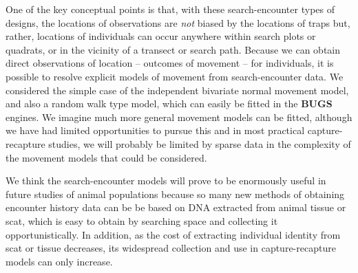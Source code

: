 One of the key conceptual points is that, with these search-encounter
types of designs, the locations of observations are {\it not} biased
by the locations of traps but, rather, locations of individuals can
occur anywhere within search plots or quadrats, or in the vicinity of
a transect or search path.  Because we can obtain direct observations
of location -- outcomes of movement -- for individuals, it is possible
to resolve explicit models of movement from search-encounter data.  We
considered the simple case of the independent bivariate normal
movement model, and also a random walk type model, which can easily be
fitted in the {\bf BUGS} engines.  We imagine much more general
movement models can be fitted, although we have had limited
opportunities to pursue this and in most practical capture-recapture
studies, we will probably be limited by sparse data in the complexity
of the movement models that could be considered.

We think the search-encounter models will prove to be enormously
useful in future studies of animal populations because so many new
methods of obtaining encounter history data can be be based on DNA
extracted from animal tissue or scat, which is easy to obtain by
searching space and collecting it opportunistically.  In addition, as
the cost of extracting individual identity from scat or tissue
decreases, its widespread collection and use in capture-recapture
models can only increase. 
